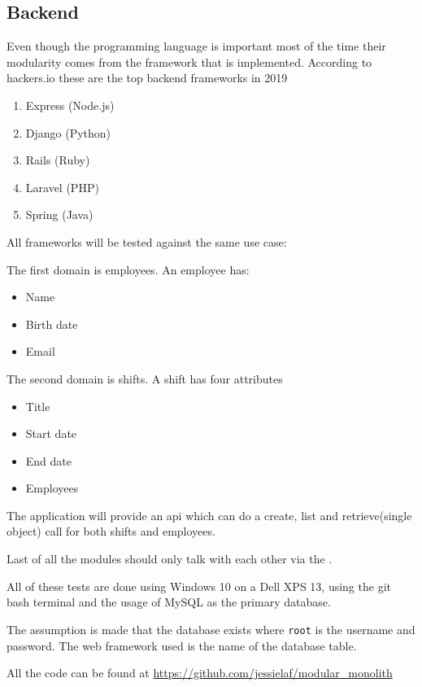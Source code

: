 \subsection{Backend}
\label{sec:BackendImplementation}

Even though the programming language is important most of the time their modularity comes from the framework that is implemented. According to hackers.io these are the top backend frameworks in 2019 \cite{topFrameworks}

\begin{enumerate}
    \item Express (Node.js)
    \item Django (Python)
    \item Rails (Ruby)
    \item Laravel (PHP)
    \item Spring (Java)
\end{enumerate}

All frameworks will be tested against the same use case:

The first domain is employees. An employee has:
\begin{itemize}
    \item Name
    \item Birth date
    \item Email
\end{itemize}

The second domain is shifts. A shift has four attributes
\begin{itemize}
    \item Title
    \item Start date
    \item End date
    \item Employees
\end{itemize}

The application will provide an api which can do a create, list and retrieve(single object) call for both shifts and employees.

Last of all the modules should only talk with each other via the .

All of these tests are done using Windows 10 on a Dell XPS 13, using the git bash terminal and the usage of MySQL as the primary database.

The assumption is made that the database exists where \texttt{root} is the username and password. The web framework used is the name of the database table.

All the code can be found at \url{https://github.com/jessielaf/modular_monolith}

